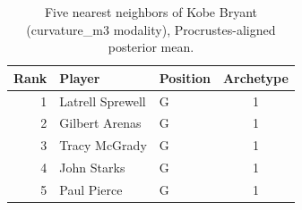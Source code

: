 \begin{table}[htbp]
  \centering\small
  \begin{tabular}{rllc}
    \toprule
    Rank & Player & Position & Archetype \\
    \midrule
    1 & Latrell Sprewell & G & 1 \\
    2 & Gilbert Arenas & G & 1 \\
    3 & Tracy McGrady & G & 1 \\
    4 & John Starks & G & 1 \\
    5 & Paul Pierce & G & 1 \\
    \bottomrule
  \end{tabular}
  \caption{Five nearest neighbors of Kobe Bryant (curvature_m3 modality), Procrustes-aligned posterior mean.}
  \label{tab:Kobe_Bryant_neighbors_curvature_m3}
\end{table}

